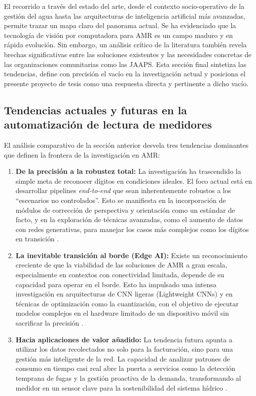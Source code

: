 El recorrido a través del estado del arte, desde el contexto socio-operativo de la gestión del agua hasta las arquitecturas de inteligencia artificial más avanzadas, permite trazar un mapa claro del panorama actual. Se ha evidenciado que la tecnología de visión por computadora para AMR es un campo maduro y en rápida evolución. Sin embargo, un análisis crítico de la literatura también revela brechas significativas entre las soluciones existentes y las necesidades concretas de las organizaciones comunitarias como las JAAPS. Esta sección final sintetiza las tendencias, define con precisión el vacío en la investigación actual y posiciona el presente proyecto de tesis como una respuesta directa y pertinente a dicho vacío.

\subsection{Tendencias actuales y futuras en la automatización de lectura de medidores}
\label{ssec:trends_and_future}

El análisis comparativo de la sección anterior desvela tres tendencias dominantes que definen la frontera de la investigación en AMR:

\begin{enumerate}
    \item \textbf{De la precisión a la robustez total:} La investigación ha trascendido la simple meta de reconocer dígitos en condiciones ideales. El foco actual está en desarrollar pipelines \textit{end-to-end} que sean inherentemente robustos a los ``escenarios no controlados''. Esto se manifiesta en la incorporación de módulos de corrección de perspectiva y orientación como un estándar de facto, y en la exploración de técnicas avanzadas, como el aumento de datos con redes generativas, para manejar los casos más complejos como los dígitos en transición \parencite{Peng2023Deep, Sripanuskul2022Generative}.

    \item \textbf{La inevitable transición al borde (Edge AI):} Existe un reconocimiento creciente de que la viabilidad de las soluciones de AMR a gran escala, especialmente en contextos con conectividad limitada, depende de su capacidad para operar en el borde. Esto ha impulsado una intensa investigación en arquitecturas de CNN ligeras (Lightweight CNNs) y en técnicas de optimización como la cuantización, con el objetivo de ejecutar modelos complejos en el hardware limitado de un dispositivo móvil sin sacrificar la precisión \parencite{Zou2021, Carvalho2023}.

    \item \textbf{Hacia aplicaciones de valor añadido:} La tendencia futura apunta a utilizar los datos recolectados no solo para la facturación, sino para una gestión más inteligente de la red. La capacidad de analizar patrones de consumo en tiempo casi real abre la puerta a servicios como la detección temprana de fugas y la gestión proactiva de la demanda, transformando al medidor en un sensor clave para la sostenibilidad del sistema hídrico \parencite{Kainz2021Measurement}.
\end{enumerate}

